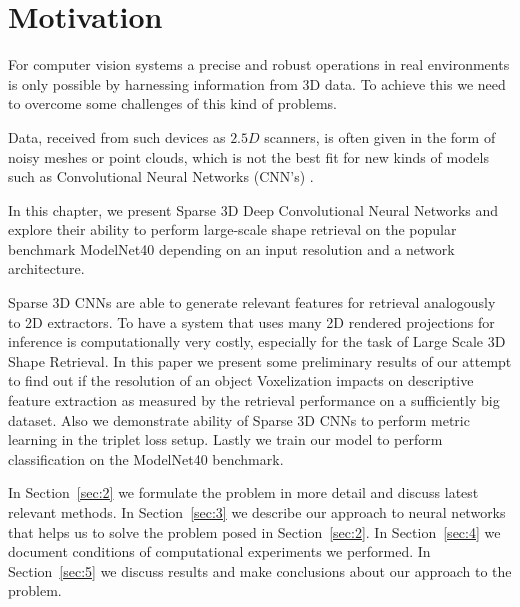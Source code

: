 \section{Motivation}

For computer vision systems a precise and robust operations in real environments is only possible by harnessing information from 3D data. To achieve this we need to overcome some challenges of this kind of problems.

Data, received from such devices as $2.5D$ scanners, is often given in the form of noisy meshes or point clouds, which is not the best fit for new kinds of models such as Convolutional Neural Networks (CNN's) \cite{lecun1995convolutional}.

In this chapter, we present Sparse 3D Deep Convolutional Neural Networks and explore their ability to perform large-scale shape retrieval on the popular benchmark ModelNet40 \cite{wu20153d} depending on an input resolution and a network architecture.

Sparse 3D CNNs are able to generate relevant features for retrieval analogously to 2D extractors. To have a system that uses many 2D rendered projections for inference is computationally very costly, especially for the task of Large Scale 3D Shape Retrieval. In this paper we present some preliminary results of our attempt to find out if the resolution of an object Voxelization impacts on descriptive feature extraction as measured by the retrieval performance on a sufficiently big dataset. Also we demonstrate ability of Sparse 3D CNNs to perform metric learning in the triplet loss setup. Lastly we train our model to perform classification on the ModelNet40 benchmark.

In Section~\ref{sec:2} we formulate the problem in more detail and discuss latest relevant methods.
In Section~\ref{sec:3} we describe our approach to neural networks that helps us to solve the problem posed in Section~\ref{sec:2}.
In Section~\ref{sec:4} we document conditions of computational experiments we performed.
In Section~\ref{sec:5} we discuss results and make conclusions about our approach to the problem.

